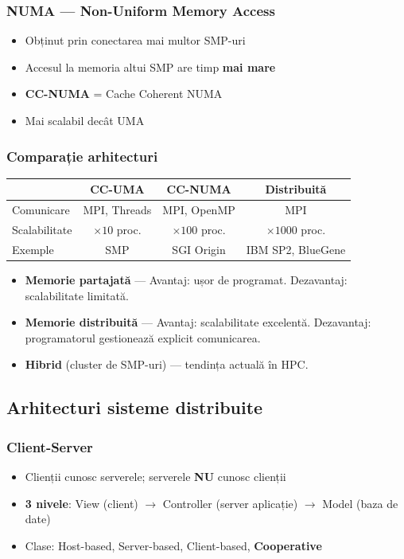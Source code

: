 \documentclass[a4paper,11pt]{article}
\newcommand{\thead}[1]{\cellcolor{tblheader}\color{white}\textbf{#1}}
\begin{document}
\subsubsection{NUMA — Non-Uniform Memory Access}
\begin{itemize}[noitemsep]
  \item Obținut prin conectarea mai multor SMP-uri
  \item Accesul la memoria altui SMP are timp \textbf{mai mare}
  \item \textbf{CC-NUMA} = Cache Coherent NUMA
  \item Mai scalabil decât UMA
\end{itemize}

\subsubsection{Comparație arhitecturi}

\begin{center}
\begin{tabular}{lccc}
\toprule
\thead{} & \thead{CC-UMA} & \thead{CC-NUMA} & \thead{Distribuită} \\
\midrule
Comunicare & MPI, Threads & MPI, OpenMP & MPI \\
Scalabilitate & $\times 10$ proc. & $\times 100$ proc. & $\times 1000$ proc. \\
Exemple & SMP & SGI Origin & IBM SP2, BlueGene \\
\bottomrule
\end{tabular}
\end{center}

\begin{itemize}[noitemsep]
  \item \textbf{Memorie partajată} — Avantaj: ușor de programat. Dezavantaj: scalabilitate limitată.
  \item \textbf{Memorie distribuită} — Avantaj: scalabilitate excelentă. Dezavantaj: programatorul gestionează explicit comunicarea.
  \item \textbf{Hibrid} (cluster de SMP-uri) — tendința actuală în HPC.
\end{itemize}

\subsection{Arhitecturi sisteme distribuite}

\subsubsection{Client-Server}
\begin{itemize}[noitemsep]
  \item Clienții cunosc serverele; serverele \textbf{NU} cunosc clienții
  \item \textbf{3 nivele}: View (client) $\to$ Controller (server aplicație) $\to$ Model (baza de date)
  \item Clase: Host-based, Server-based, Client-based, \textbf{Cooperative}
\end{itemize}
\end{document}
